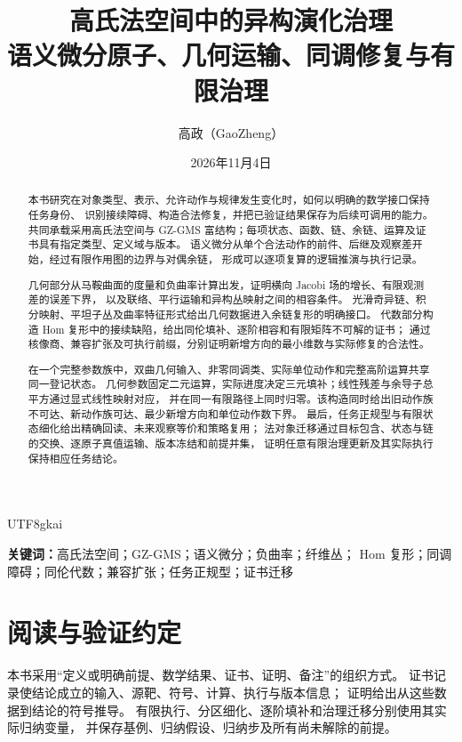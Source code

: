 \documentclass[12pt,a4paper,openany,notitlepage]{report}
\title{\bfseries 高氏法空间中的异构演化治理\\[0.65em]\large 语义微分原子、几何运输、同调修复与有限治理}
\author{高政（GaoZheng）}
\date{2026年11月4日}
\theoremstyle{plain}
\theoremstyle{definition}
\theoremstyle{remark}
\begin{document}
\begin{CJK*}{UTF8}{gkai}
\begingroup
{}
\setlength{\parskip}{0.20em}
\setlength{\parindent}{2em}
\maketitle
\thispagestyle{empty}
{}
\begin{abstract}
本书研究在对象类型、表示、允许动作与规律发生变化时，如何以明确的数学接口保持任务身份、
识别接续障碍、构造合法修复，并把已验证结果保存为后续可调用的能力。
共同承载采用高氏法空间与 GZ-GMS 富结构；每项状态、函数、链、余链、运算及证书具有指定类型、定义域与版本。
语义微分从单个合法动作的前件、后继及观察差开始，经过有限作用图的边界与对偶余链，
形成可以逐项复算的逻辑推演与执行记录。

几何部分从马鞍曲面的度量和负曲率计算出发，证明横向 Jacobi 场的增长、有限观测差的误差下界，
以及联络、平行运输和异构丛映射之间的相容条件。
光滑奇异链、积分映射、平坦子丛及曲率特征形式给出几何数据进入余链复形的明确接口。
代数部分构造 Hom 复形中的接续缺陷，给出同伦填补、逐阶相容和有限矩阵不可解的证书；
通过核像商、兼容扩张及可执行前缀，分别证明新增方向的最小维数与实际修复的合法性。

在一个完整参数族中，双曲几何输入、非零同调类、实际单位动作和完整高阶运算共享同一登记状态。
几何参数固定二元运算，实际进度决定三元填补；线性残差与余导子总平方通过显式线性映射对应，
并在同一有限路径上同时归零。该构造同时给出旧动作族不可达、新动作族可达、最少新增方向和单位动作数下界。
最后，任务正规型与有限状态细化给出精确回读、未来观察等价和策略复用；
法对象迁移通过目标包含、状态与链的交换、逐原子真值运输、版本冻结和前提并集，
证明任意有限治理更新及其实际执行保持相应任务结论。
\end{abstract}

\noindent\textbf{关键词：}高氏法空间；GZ-GMS；语义微分；负曲率；纤维丛；
Hom 复形；同调障碍；同伦代数；兼容扩张；任务正规型；证书迁移
\par
\endgroup
\clearpage
\tableofcontents
\clearpage
\chapter*{阅读与验证约定}
本书采用“定义或明确前提、数学结果、证书、证明、备注”的组织方式。
证书记录使结论成立的输入、源靶、符号、计算、执行与版本信息；
证明给出从这些数据到结论的符号推导。
有限执行、分区细化、逐阶填补和治理迁移分别使用其实际归纳变量，
并保存基例、归纳假设、归纳步及所有尚未解除的前提。


\end{CJK*}
\end{document}
